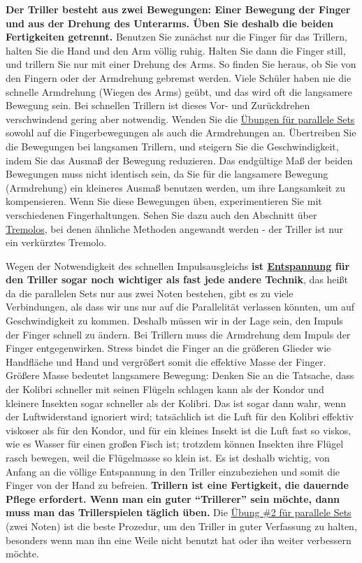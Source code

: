 \textbf{Der Triller besteht aus zwei Bewegungen: Einer Bewegung der Finger und aus der Drehung des Unterarms.
Üben Sie deshalb die beiden Fertigkeiten getrennt.}
Benutzen Sie zunächst nur die Finger für das Trillern, halten Sie die Hand und den Arm völlig ruhig.
Halten Sie dann die Finger still, und trillern Sie nur mit einer Drehung des Arms.
So finden Sie heraus, ob Sie von den Fingern oder der Armdrehung gebremst werden.
Viele Schüler haben nie die schnelle Armdrehung (Wiegen des Arms) geübt, und das wird oft die langsamere Bewegung sein.
Bei schnellen Trillern ist dieses Vor- und Zurückdrehen verschwindend gering aber notwendig.
Wenden Sie die \hyperref[c1iii7b]{Übungen für parallele Sets} sowohl auf die Fingerbewegungen als auch die Armdrehungen an.
Übertreiben Sie die Bewegungen bei langsamen Trillern, und steigern Sie die Geschwindigkeit, indem Sie das Ausmaß der Bewegung reduzieren.
Das endgültige Maß der beiden Bewegungen muss nicht identisch sein, da Sie für die langsamere Bewegung (Armdrehung) ein kleineres Ausmaß benutzen werden, um ihre Langsamkeit zu kompensieren.
Wenn Sie diese Bewegungen üben, experimentieren Sie mit verschiedenen Fingerhaltungen.
Sehen Sie dazu auch den Abschnitt über \hyperref[c1iii3b]{Tremolos}, bei denen ähnliche Methoden angewandt werden - der Triller ist nur ein verkürztes Tremolo.

Wegen der Notwendigkeit des schnellen Impulsausgleichs \textbf{ist \hyperref[c1ii14]{Entspannung} für den Triller sogar noch wichtiger als fast jede andere Technik}, das heißt da die parallelen Sets nur aus zwei Noten bestehen, gibt es zu viele Verbindungen, als dass wir uns nur auf die Parallelität verlassen könnten, um auf Geschwindigkeit zu kommen.
Deshalb müssen wir in der Lage sein, den Impuls der Finger schnell zu ändern.
Bei Trillern muss die Armdrehung dem Impuls der Finger entgegenwirken.
Stress bindet die Finger an die größeren Glieder wie Handfläche und Hand und vergrößert somit die effektive Masse der Finger.
Größere Masse bedeutet langsamere Bewegung: Denken Sie an die Tatsache, dass der Kolibri schneller mit seinen Flügeln schlagen kann als der Kondor und kleinere Insekten sogar schneller als der Kolibri.
Das ist sogar dann wahr, wenn der Luftwiderstand ignoriert wird; tatsächlich ist die Luft für den Kolibri effektiv viskoser als für den Kondor, und für ein kleines Insekt ist die Luft fast so viskos, wie es Wasser für einen großen Fisch ist; trotzdem können Insekten ihre Flügel rasch bewegen, weil die Flügelmasse so klein ist.
Es ist deshalb wichtig, von Anfang an die völlige Entspannung in den Triller einzubeziehen und somit die Finger von der Hand zu befreien.
\textbf{Trillern ist eine Fertigkeit, die dauernde Pflege erfordert.
Wenn man ein guter \enquote{Trillerer} sein möchte, dann muss man das Trillerspielen täglich üben.}
Die \hyperref[c1iii7b2]{Übung \#2 für parallele Sets} (zwei Noten) ist die beste Prozedur, um den Triller in guter Verfassung zu halten, besonders wenn man ihn eine Weile nicht benutzt hat oder ihn weiter verbessern möchte.

